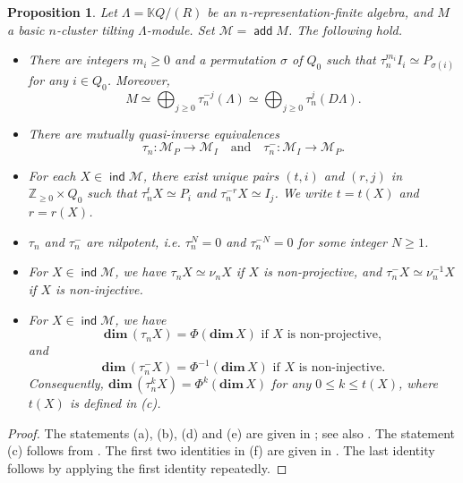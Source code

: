 \documentclass[11pt,a4paper]{amsart}
\newtheorem{proposition}[theorem]{Proposition}
\theoremstyle{definition}
\numberwithin{equation}{section}
\newcommand{\0}{\mathbf{0}}
\newcommand{\dimv}{\mathbf{dim}\,}
\DeclareMathOperator{\add}{\mathsf{add}}
\DeclareMathOperator{\ind}{\mathsf{ind}}
\begin{document}
	
	
	\begin{proposition}\label{cluster proper} 
		Let $\Lambda=\mathbb KQ/(R)$ be an $n$-representation-finite
		algebra, and $M$ a basic $n$-cluster tilting
		$\Lambda$-module. Set $\mathcal{M}=\add M$.  The following hold.
		\begin{itemize}
			\item[(a)] There are integers $m_i\ge0$ 
			and a  permutation $\sigma$ of $Q_0$ such that
			$\tau_n^{m_i}I_i\simeq P_{\sigma(i)}$ 	for any	$i\in Q_0$. Moreover, 
			\[
			M\simeq\bigoplus_{j\geq0}\tau_n^{-j}(\Lambda)
			\simeq\bigoplus_{j\geq0}\tau_n^j(D\Lambda).
			\] 
			\item[(b)] There are mutually quasi-inverse equivalences
			  $$\tau_n \colon \mathcal{M}_P \to \mathcal{M}_I\quad \text{and} \quad\tau_n^- \colon \mathcal{M}_I \to \mathcal{M}_P.$$ 
			\item[(c)] For each $X\in\ind\mathcal M$, there exist unique pairs
			$(t,i)$ and $(r,j)$ in $\mathbb Z_{\geq0}\times Q_0$ such that
			$\tau_n^tX\simeq P_i$ and $\tau_n^{-r}X\simeq I_j$.			
			We write $t=t(X)$ and $r=r(X)$.
			\item[(d)] $\tau_n$ and $\tau_n^-$ are nilpotent, i.e. $\tau_n^N=0$ and $\tau_n^{-N}=0$ for some integer $N\ge 1$.
			\item[(e)] 
			For $X\in\ind\mathcal M$, we have
			$\tau_nX\simeq\nu_nX$ if $X$ is non-projective, and
			$\tau_n^-X\simeq\nu_n^{-1}X$ if $X$ is non-injective.
			\item[(f)] For $X\in\ind\mathcal M$, we have
				  $$\dimv(\tau_nX)=\Phi(\dimv X) \text{ if $X$ is non-projective},  $$ 
				 and 
				 $$\dimv(\tau_n^-X)=\Phi^{-1}(\dimv X) \text{ if $X$ is non-injective}.  $$ 
				 Consequently, $\dimv(\tau_n^k X)=\Phi^k(\dimv X)$ for any
				 $0 \le k\le t(X)$, where $t(X)$ is defined in (c).
		\end{itemize}
	\end{proposition}
	\begin{proof} 
		 The statements (a), (b), (d) and (e) are given in
		\cite[Proposition~2.5]{Miz}; see also \cite{HI1,I3}.
		 The statement (c) follows from \cite[Proposition~0.2]{HI1}. 
		The first two identities in (f) are given in \cite[Lemma~3.1]{Miz}. 		
		The last identity follows by applying  the first identity repeatedly. 
	\end{proof}
	
	

	

	
	
\end{document}
